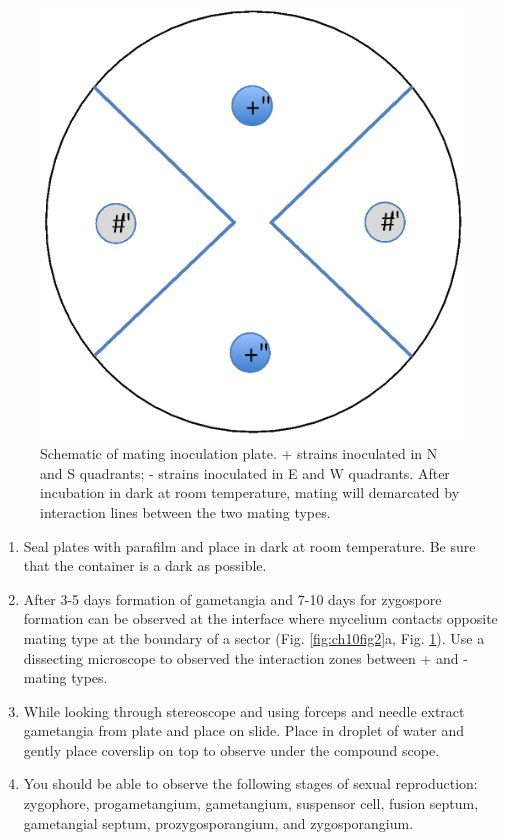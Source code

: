 \documentclass[]{book}
\providecommand{\tightlist}{%
  \setlength{\itemsep}{0pt}\setlength{\parskip}{0pt}}
\begin{document}
\begin{figure}

{\centering \includegraphics[width=6.71in]{img/Ch10_Fig3} 

}

\caption{Schematic of mating inoculation plate. + strains inoculated in N and S quadrants; - strains inoculated in E and W quadrants.  After incubation in dark at room temperature, mating will demarcated by interaction lines between the two mating types.}\label{fig:ch10fig3}
\end{figure}

\begin{enumerate}
\def\labelenumi{\arabic{enumi}.}
\setcounter{enumi}{4}
\tightlist
\item
  Seal plates with parafilm and place in dark at room temperature. Be sure that the container is a dark as possible.
\item
  After 3-5 days formation of gametangia and 7-10 days for zygospore formation can be observed at the interface where mycelium contacts opposite mating type at the boundary of a sector (Fig. \ref{fig:ch10fig2}a, Fig. \ref{fig:ch10fig3}). Use a dissecting microscope to observed the interaction zones between + and - mating types.
\item
  While looking through stereoscope and using forceps and needle extract gametangia from plate and place on slide. Place in droplet of water and gently place coverslip on top to observe under the compound scope.
\item
  You should be able to observe the following stages of sexual reproduction: zygophore, progametangium, gametangium, suspensor cell, fusion septum, gametangial septum, prozygosporangium, and zygosporangium.
\end{enumerate}
\end{document}
